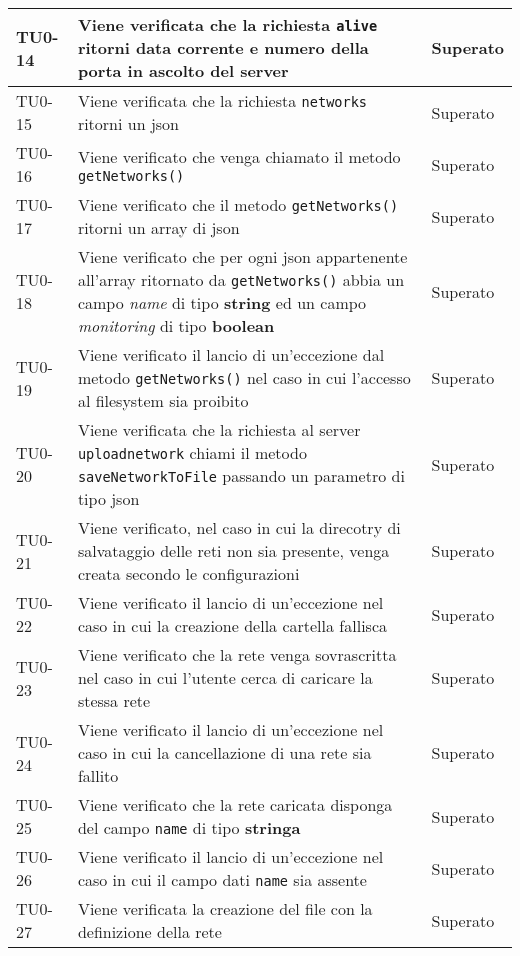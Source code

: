 \begin{longtable}{|C{.15\textwidth}|m{.65\textwidth}|C{.20\textwidth}|}
\hline
{} TU0-14 & Viene verificata che la richiesta \texttt{alive} ritorni data corrente e numero della porta in ascolto del server & Superato \\ 
\hline 
TU0-15 & Viene verificata che la richiesta \texttt{networks} ritorni un json & Superato \\ 
 TU0-16 & Viene verificato che venga chiamato il metodo \texttt{getNetworks()} & Superato \\
TU0-17 & Viene verificato che il metodo \texttt{getNetworks()} ritorni un array di json & Superato \\ 
\hline
{} TU0-18 & Viene verificato che per ogni json appartenente all'array ritornato da \texttt{getNetworks()} abbia un campo \textit{name} di tipo \textbf{string} ed un campo \textit{monitoring} di tipo \textbf{boolean} & Superato \\ 
\hline
TU0-19 & Viene verificato il lancio di un'eccezione dal metodo \texttt{getNetworks()} nel caso in cui l'accesso al filesystem sia proibito & Superato \\ 
\hline 
{}TU0-20 & Viene verificata che la richiesta al server \texttt{uploadnetwork} chiami il metodo \texttt{saveNetworkToFile} passando un parametro di tipo json & Superato \\ 
\hline 
TU0-21 & Viene verificato, nel caso in cui la direcotry di salvataggio delle reti non sia presente, venga creata secondo le configurazioni & Superato \\ 
\hline 
{} TU0-22 & Viene verificato il lancio di un'eccezione nel caso in cui la creazione della cartella fallisca & Superato \\ 
\hline 
TU0-23 & Viene verificato che la rete venga sovrascritta nel caso in cui l'utente cerca di caricare la stessa rete & Superato \\
\hline
  TU0-24 & Viene verificato il lancio di un'eccezione nel caso in cui la cancellazione di una rete sia fallito & Superato \\ 
\hline
TU0-25 & Viene verificato che la rete caricata disponga del campo \texttt{name} di tipo \textbf{stringa} & Superato \\ 
\hline 
{} TU0-26 & Viene verificato il lancio di un'eccezione nel caso in cui il campo dati \texttt{name} sia assente & Superato \\ 
\hline 
TU0-27	 & Viene verificata la creazione del file con la definizione della rete & Superato \\ 

\end{longtable}
